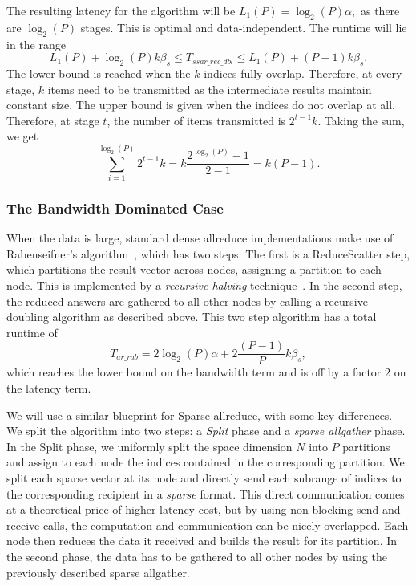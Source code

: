 \documentclass[11pt]{article}
\begin{document}
The resulting latency for the \ssarone{} algorithm will be
$L_1(P) = \log_2(P)\alpha,$ as there are $\log_2(P)$ stages. This is
optimal and data-independent.  The runtime will lie in the range
$$L_1(P) + \log_2(P)k\beta_s \leq T_{ssar\_rec\_dbl} \leq L_1(P) +
(P-1)k\beta_s.$$
The lower bound is reached when the $k$ indices fully
overlap.  Therefore, at every stage, $k$ items need to be transmitted as
the intermediate results maintain constant size.  The upper bound is
given when the indices do not overlap at all.  Therefore, at stage $t$,
the number of items transmitted is $2^{t-1}k$. Taking the sum, we get
$$\sum_{i=1}^{\log_2(P)}2^{t-1}k = k\frac{2^{\log_2(P)} - 1}{2-1} =
k(P-1).$$

\subsubsection{The Bandwidth Dominated Case} 

When the data is large, standard dense allreduce implementations make use of Rabenseifner's algorithm~\cite{rabenseifner2004optimization}, which has two steps. 
The first is a ReduceScatter step, which partitions the result vector across nodes, assigning a partition to each node. 
This is implemented by a \emph{recursive halving} technique~\cite{rabenseifner2004optimization}. 
In the second step, the reduced answers are gathered to all other nodes by calling a recursive doubling algorithm as described above. 
This two step algorithm has a total runtime of $$T_{ar\_rab} = 2\log_2(P)\alpha + 2\frac{(P-1)}{P}k\beta_s,$$ which reaches the lower bound on the bandwidth term and is off by a factor $2$ on the latency term. 


We will use a similar blueprint for Sparse allreduce, with some key differences. 
We split the algorithm into two steps: a \emph{Split} phase and a \emph{sparse allgather} phase. 
In the Split phase, we uniformly split the space dimension $N$ into $P$ partitions and assign to each node the indices contained in the corresponding partition. 
We split each sparse vector at its node and directly send each subrange of indices to the corresponding recipient in a \emph{sparse} format. 
This direct communication comes at a theoretical price of higher latency cost, but by using non-blocking send and receive calls, the computation and communication can be nicely overlapped.
Each node then reduces the data it received and builds the result for its partition. 
In the second phase, the data has to be gathered to all other nodes by using the previously described sparse allgather.
\end{document}
